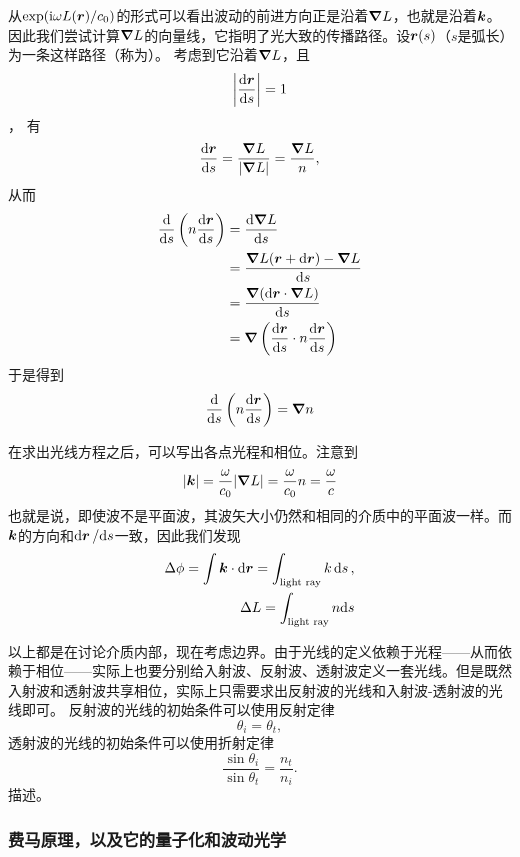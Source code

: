 从$\exp (\mathrm{i} \omega L(\vb*{r}) / c_0)$的形式可以看出波动的前进方向正是沿着$\grad{L}$，也就是沿着$\vb*{k}$。
因此我们尝试计算$\grad{L}$的向量线，它指明了光大致的传播路径。设$\vb*{r}(s)$（$s$是弧长）为一条这样路径（称为）。
考虑到它沿着$\grad{L}$，且
\[
    \abs{\dv{\vb*{r}}{s}} = 1
\]，
有
\[
    \dv{\vb*{r}}{s} = \frac{\grad{L}}{\abs{\grad{L}}} = \frac{\grad{L}}{n},
\]
从而
\[
    \begin{aligned}
        \dv{s}\left(n \dv{\vb*{r}}{s}\right) &= \dv{\grad{L}}{s} \\
        &= \frac{\grad{L}(\vb*{r} + \dd \vb*{r}) - \grad{L}}{\dd s} \\
        &= \frac{\grad{(\dd \vb*{r} \cdot \grad{L})}}{\dd s} \\
        &= \grad{\left( \dv{\vb*{r}}{s} \cdot n \dv{\vb*{r}}{s} \right)}
    \end{aligned}
\]
于是得到
\begin{equation}
    \dv{s} \left( n \dv{\vb*{r}}{s} \right) = \grad{n}
    \label{eq:light-ray}
\end{equation}

在求出光线方程之后，可以写出各点光程和相位。注意到
\[
    \abs{\vb*{k}} = \frac{\omega}{c_0} \abs{\grad{L}} = \frac{\omega}{c_0} n = \frac{\omega}{c}
\]
也就是说，即使波不是平面波，其波矢大小仍然和相同的介质中的平面波一样。而$\vb*{k}$的方向和$\dd{\vb*{r}} / \dd s$一致，因此我们发现
\begin{equation}
    \begin{aligned}
        \Delta \phi = \int \vb*{k} \cdot \dd{\vb*{r}} = \int_\text{light ray} k \dd{s}, \\
        \Delta L = \int_\text{light ray} n \dd s
    \end{aligned}
    \label{eq:light-ray-and-phrase}
\end{equation}

以上都是在讨论介质内部，现在考虑边界。由于光线的定义依赖于光程——从而依赖于相位——实际上也要分别给入射波、反射波、透射波定义一套光线。但是既然入射波和透射波共享相位，实际上只需要求出反射波的光线和入射波-透射波的光线即可。
反射波的光线的初始条件可以使用反射定律
\[
    \theta_i = \theta_t,
\]
透射波的光线的初始条件可以使用折射定律
\[
    \frac{\sin \theta_i}{\sin \theta_t} = \frac{n_t}{n_i}.
\]
描述。

\subsubsection{费马原理，以及它的量子化和波动光学}

